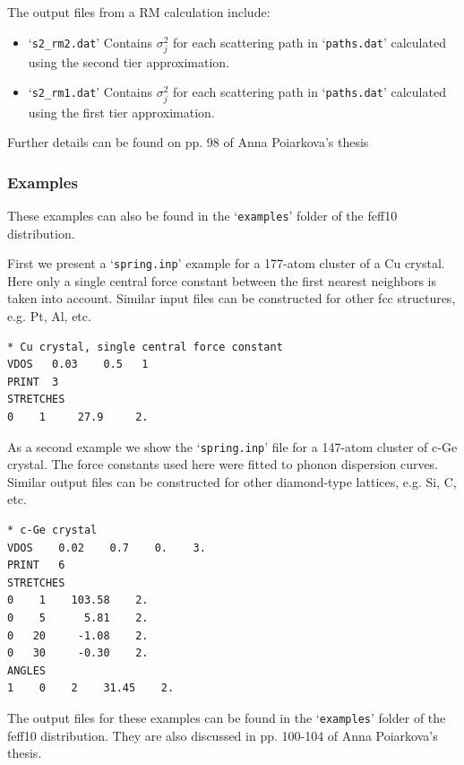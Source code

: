 \documentclass[11pt,oneside]{report} %
\renewcommand{\htmlref}[2]{\hyperlink{#2}{#1}}
\newcommand{\file}[1]{`\texttt{#1}'}
\renewcommand{\htmlref}[2]{{#1}} %
\begin{document}
The output files from a RM calculation include:
\begin{itemize}
\item \file{s2\_rm2.dat}  Contains $\sigma_j^2$ for each scattering path in \file{paths.dat} calculated using the second tier approximation.
\item \file{s2\_rm1.dat}  Contains $\sigma_j^2$ for each scattering path in \file{paths.dat} calculated using the first tier approximation.
\end{itemize}

Further details can be found on pp. 98 of  \htmlref{Anna Poiarkova's thesis}{http://leonardo.phys.washington.edu/feff/papers/dissertations/thesis_poiarkova.ps}

\subsubsection{Examples}

These examples can also be found in the \file{examples} folder of the feff10 distribution.

First we present a \file{spring.inp} example for a 177-atom cluster of a Cu crystal.  Here only a single central force constant between the first nearest neighbors is taken into account.  Similar input files can be constructed for other fcc structures, e.g. Pt, Al, etc.
\begin{verbatim}
* Cu crystal, single central force constant
VDOS   0.03    0.5   1
PRINT  3
STRETCHES
0    1     27.9     2.
\end{verbatim}


As a second example we show the \file{spring.inp} file for a 147-atom cluster of c-Ge crystal.  The force constants used here were fitted to phonon dispersion curves.  Similar output files can be constructed for other diamond-type lattices, e.g. Si, C, etc.
\begin{verbatim}
* c-Ge crystal
VDOS    0.02    0.7    0.    3.
PRINT   6
STRETCHES
0    1    103.58    2.
0    5      5.81    2.
0   20     -1.08    2.
0   30     -0.30    2.
ANGLES
1    0    2    31.45    2.
\end{verbatim}

The output files for these examples can be found in the \file{examples} folder of the feff10 distribution.  They are also discussed in pp. 100-104 of  \htmlref{Anna Poiarkova's thesis}{http://leonardo.phys.washington.edu/feff/papers/dissertations/thesis_poiarkova.ps}.
\end{document}
